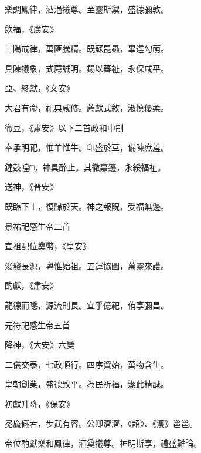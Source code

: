 \begin{pinyinscope}
 樂調鳳律，酒浥犧尊。至靈斯禦，盛德彌敦。



 飲福，《廣安》



 三陽戒律，萬匯騰精。既蘇昆蟲，畢達勾萌。



 具陳犧象，式薦誠明。錫以蕃祉，永保咸平。



 亞、終獻，《文安》



 大君有命，祀典咸修。薦獻式敘，淑慎優柔。



 徹豆，《肅安》以下二首政和中制



 奉承明祀，惟羊惟牛。卬盛於豆，備陳庶羞。



 鐘鼓喤□，神具醉止。其徹嘉籩，永綏福祉。



 送神，《普安》



 既臨下土，復歸於天。神之報貺，受福無邊。



 景祐祀感生帝二首



 宣祖配位奠幣，《皇安》



 浚發長源，粵惟始祖。五運協圖，萬靈來護。



 酌獻，《肅安》



 龍德而隱，源流則長。宜乎億祀，侑享彌昌。



 元符祀感生帝五首



 降神，《大安》六變



 二儀交泰，七政順行。四序資始，萬物含生。



 皇朝創業，盛德致平。為民祈福，潔此精誠。



 初獻升降，《保安》



 冕旒儼若，步武有容。公卿濟濟，《韶》、《濩》邕邕。



 帝位酌獻樂和鳳律，酒奠犧尊。神明斯享，禮盛難論。




\end{pinyinscope}
